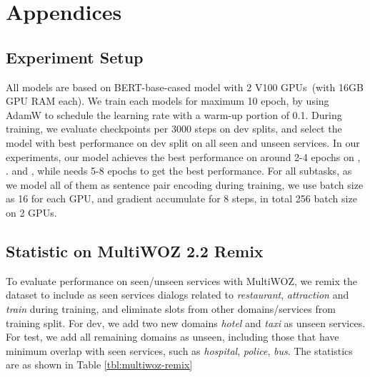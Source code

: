 \appendix

\section{Appendices}
\label{sec:appendix}

\subsection{Experiment Setup}
\label{ssec:exp-setup}
All models are based on BERT-base-cased model with 2 V100 GPUs~(with
16GB GPU RAM each). We train each models for maximum 10 epoch, by
using AdamW to schedule the learning rate with a warm-up portion of
0.1. During training, we evaluate checkpoints per 3000 steps on dev
splits, and select the model with best performance on dev split on all
seen and unseen services. In our experiments, our model achieves the
best performance on around 2-4 epochs on \IC, \RSI. and \CSL, while
\NSL needs 5-8 epochs to get the best performance. For all subtasks, as
we model all of them as sentence pair encoding during training, we use
batch size as 16 for each GPU, and gradient accumulate for 8 steps, in
total 256 batch size on 2 GPUs.


\subsection{Statistic on MultiWOZ 2.2 Remix}
\label{ssec:appendices-multiwoz-dataset}
To evaluate performance on seen/unseen services with MultiWOZ, we
remix the \multiwoz dataset to include as seen services dialogs
related to \textit{restaurant}, \textit{attraction} and \textit{train}
during training, and eliminate slots from other domains/services from
training split.  For dev, we add two new domains {\it hotel} and {\it
  taxi} as unseen services. For test, we add all remaining domains as
unseen, including those that have minimum overlap with seen services,
such as {\it hospital}, {\it police}, {\it bus}. The statistics are as shown in Table \ref{tbl:multiwoz-remix}


